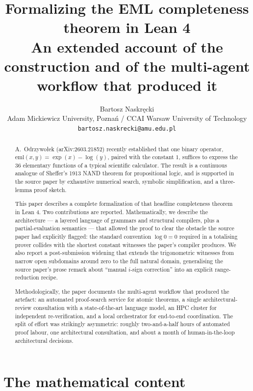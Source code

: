 \documentclass[11pt,a4paper]{article}
\title{Formalizing the EML completeness theorem in Lean 4\\[4pt]
       \large An extended account of the construction and of the
       multi-agent workflow that produced it}
\author{Bartosz Naskręcki\\[2pt]
  \small Adam Mickiewicz University, Poznań / CCAI Warsaw University of Technology\\
  \small \texttt{bartosz.naskrecki@amu.edu.pl}}
\date{}
\theoremstyle{plain}
\theoremstyle{definition}
\begin{document}
\maketitle

\begin{abstract}
A.~Odrzywołek (arXiv:2603.21852) recently established that one
binary operator, $\mathrm{eml}(x, y) = \exp(x) - \log(y)$, paired
with the constant $1$, suffices to express the $36$ elementary
functions of a typical scientific calculator. The result is a
continuous analogue of Sheffer's 1913 NAND theorem for propositional
logic, and is supported in the source paper by exhaustive numerical
search, symbolic simplification, and a three-lemma proof sketch.

This paper describes a complete formalization of that headline
completeness theorem in Lean 4. Two contributions are reported.
Mathematically, we describe the architecture --- a layered language
of grammars and structural compilers, plus a partial-evaluation
semantics --- that allowed the proof to clear the obstacle the source
paper had explicitly flagged: the standard convention $\log 0 = 0$
required in a totalising prover collides with the shortest constant
witnesses the paper's compiler produces. We also report a
post-submission widening that extends the trigonometric witnesses
from narrow open subdomains around zero to the full natural domain,
generalising the source paper's prose remark about ``manual $i$-sign
correction'' into an explicit range-reduction recipe.

Methodologically, the paper documents the multi-agent workflow that
produced the artefact: an automated proof-search service for atomic
theorems, a single architectural-review consultation with a
state-of-the-art language model, an HPC cluster for independent
re-verification, and a local orchestrator for end-to-end coordination.
The split of effort was strikingly asymmetric: roughly two-and-a-half
hours of automated proof labour, one architectural consultation, and
about a month of human-in-the-loop architectural decisions.
\end{abstract}

\tableofcontents

\part{The mathematical content}
\end{document}
